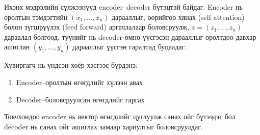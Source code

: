 \documentclass[11pt,a4paper]{article}
\begin{document}
Ихэнх мэдрэлийн сүлжээнүүд encoder--decoder бүтэцтэй байдаг. Encoder нь оролтын тэмдэгтийн \((x_1,\dots,x_n)\) дарааллыг, өөрийгөө хянах (self-attention) болон зүгшрүүлэх (feed forward) аргачлалаар боловсруулж, \(z=(z_1,\dots,z_n)\) дараалал болгоод, түүнийг нь decoder өмнө үүсгэсэн дарааллыг оролтдоо давхар ашиглан \((y_1,\dots,y_n)\) дарааллыг үүсгэн гаралтад буцаадаг.

Хувиргагч нь үндсэн хоёр хэсгээс бүрдэнэ:
\begin{enumerate}
\item Encoder--оролтын өгөгдлийг хүлээн авах
\item Decoder--боловсруулсан өгөгдлийг гаргах
\end{enumerate}

Товчхондоо encoder нь вектор өгөгдлийг цуглуулж санах ойг бүтээдэг бол decoder нь санах ойг ашиглах замаар хариултыг боловсруулдаг.
\end{document}

